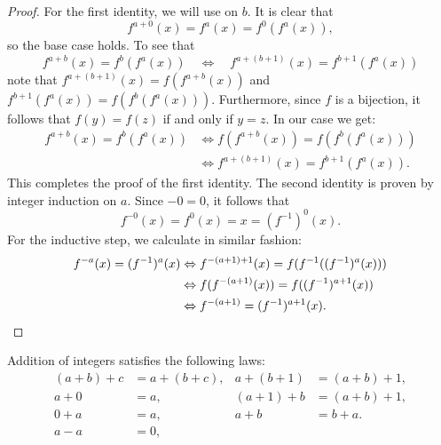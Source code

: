 \begin{proof}
  For the first identity, we will use  on $b$. It is clear that
  \begin{equation*}
    f^{a+0}(x)=f^a(x)=f^0(f^a(x)),
  \end{equation*}
  so the base case holds. To see that
  \begin{equation*}
    f^{a+b}(x)=f^b(f^a(x)) \quad\Leftrightarrow\quad f^{a+(b+1)}(x)=f^{b+1}(f^a(x))
  \end{equation*}
  note that $f^{a+(b+1)}(x)=f(f^{a+b}(x))$ and $f^{b+1}(f^a(x))=f(f^b(f^a(x)))$. Furthermore, since $f$ is a bijection, it follows that $f(y)=f(z)$ if and only if $y=z$. In our case we get:
  \begin{align*}
    f^{a+b}(x)=f^b(f^a(x)) & \Leftrightarrow f(f^{a+b}(x))=f(f^b(f^a(x))) \\
                           & \Leftrightarrow f^{a+(b+1)}(x)=f^{b+1}(f^a(x)).
  \end{align*}
  This completes the proof of the first identity. The second identity is proven by integer induction on $a$. Since $-0=0$, it follows that
  \begin{equation*}
    f^{-0}(x) = f^0(x)=x=(f^{-1})^0(x).
  \end{equation*}
  For the inductive step, we calculate in similar fashion:
  \begin{align*}
    f^{-a}(x)=(f^{-1})^a(x) & \Leftrightarrow f^{-(a+1)+1}(x) = f(f^{-1}((f^{-1})^a(x))) \\
    & \Leftrightarrow f(f^{-(a+1)}(x)) = f((f^{-1})^{a+1}(x)) \\
    & \Leftrightarrow f^{-(a+1)}=(f^{-1})^{a+1}(x). \qedhere
  \end{align*}
\end{proof}

\begin{theorem}
  Addition of integers satisfies the following laws:
  \begin{align*}
    (a+b)+c & = a+(b+c), & a+(b+1) & = (a+b)+1, \\
    a+0 & = a, & (a+1)+b & = (a+b)+1, \\
    0+a & = a, & a+b & = b+a. \\
    a-a & = 0,
  \end{align*}
\end{theorem}


